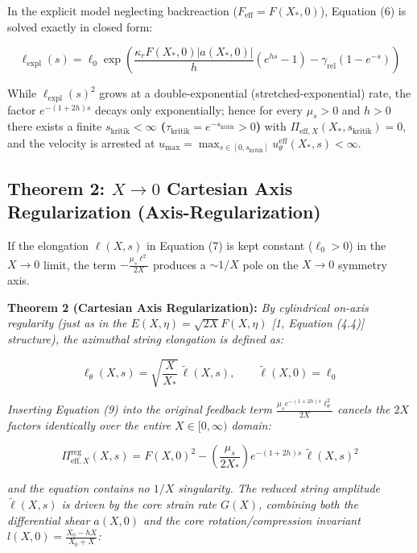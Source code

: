 \documentclass[12pt,a4paper]{article}
\begin{document}
In the explicit model neglecting backreaction ($F_{\mathrm{eff}} = F(X_*, 0)$), Equation (6) is solved exactly in closed form:

\begin{equation}
\ell_{\mathrm{expl}}(s) = \ell_0 \exp\left( \frac{\kappa_r F(X_*, 0) |a(X_*, 0)|}{h} \left( e^{h s} - 1 \right) - \gamma_{\mathrm{rel}} \left( 1 - e^{-s} \right) \right)
\end{equation}

While $\ell_{\mathrm{expl}}(s)^2$ grows at a double-exponential (stretched-exponential) rate, the factor $e^{-(1+2h)s}$ decays only exponentially; hence for every $\mu_s > 0$ and $h > 0$ there exists a finite \textbf{$s_{\mathrm{kritik}} < \infty$ ($\tau_{\mathrm{kritik}} = e^{-s_{\mathrm{kritik}}} > 0$)} with $\Pi_{\mathrm{eff}, X}(X_*, s_{\mathrm{kritik}}) = 0$, and the velocity is arrested at $u_{\max} = \max_{s \in [0, s_{\mathrm{kritik}}]} u_\theta^{\mathrm{eff}}(X_*, s) < \infty$.

\subsection{Theorem 2: $X \to 0$ Cartesian Axis Regularization (Axis-Regularization)}

If the elongation $\ell(X, s)$ in Equation (7) is kept constant ($\ell_0 > 0$) in the $X \to 0$ limit, the term $-\frac{\mu_s \ell^2}{2X}$ produces a $\sim 1/X$ pole on the $X \to 0$ symmetry axis.

\textbf{Theorem 2 (Cartesian Axis Regularization):} \textit{By cylindrical on-axis regularity (just as in the $E(X, \eta) = \sqrt{2X} F(X, \eta)$ [1, Equation (4.4)] structure), the azimuthal string elongation is defined as:}

\begin{equation}
\ell_\theta(X, s) = \sqrt{\frac{X}{X_*}} \, \tilde{\ell}(X, s), \qquad \tilde{\ell}(X, 0) = \ell_0
\end{equation}

\textit{Inserting Equation (9) into the original feedback term $\frac{\mu_s e^{-(1+2h)s} \ell_\theta^2}{2X}$ cancels the $2X$ factors identically over the entire $X \in [0, \infty)$ domain:}

\begin{equation}
\Pi_{\mathrm{eff}, X}^{\mathrm{reg}}(X, s) = F(X, 0)^2 - \left( \frac{\mu_s}{2 X_*} \right) e^{-(1+2h)s} \, \tilde{\ell}(X, s)^2
\end{equation}

\textit{and the equation contains no $1/X$ singularity. The reduced string amplitude $\tilde{\ell}(X, s)$ is driven by the core strain rate $G(X)$, combining both the differential shear $a(X, 0)$ and the core rotation/compression invariant $l(X, 0) = \frac{X_0 - hX}{X_0 + X}$:}
\end{document}
